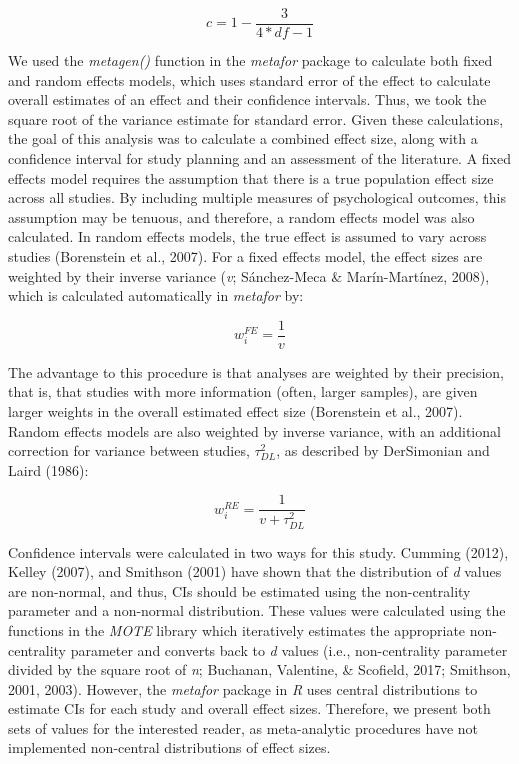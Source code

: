\documentclass[english,man, mask]{apa6}
\theoremstyle{definition}
\theoremstyle{definition}
\theoremstyle{definition}
\theoremstyle{remark}
\begin{document}
\[
c = 1 - \frac { 3 } { 4*df - 1 }
\]

We used the \emph{metagen()} function in the \emph{metafor} package to
calculate both fixed and random effects models, which uses standard
error of the effect to calculate overall estimates of an effect and
their confidence intervals. Thus, we took the square root of the
variance estimate for standard error. Given these calculations, the goal
of this analysis was to calculate a combined effect size, along with a
confidence interval for study planning and an assessment of the
literature. A fixed effects model requires the assumption that there is
a true population effect size across all studies. By including multiple
measures of psychological outcomes, this assumption may be tenuous, and
therefore, a random effects model was also calculated. In random effects
models, the true effect is assumed to vary across studies (Borenstein et
al., 2007). For a fixed effects model, the effect sizes are weighted by
their inverse variance (\emph{v}; Sánchez-Meca \& Marín-Martínez, 2008),
which is calculated automatically in \emph{metafor} by:

\[
w_{i}^{FE} = \frac {1} {v}
\]

The advantage to this procedure is that analyses are weighted by their
precision, that is, that studies with more information (often, larger
samples), are given larger weights in the overall estimated effect size
(Borenstein et al., 2007). Random effects models are also weighted by
inverse variance, with an additional correction for variance between
studies, \(\tau^2_{DL}\), as described by DerSimonian and Laird (1986):

\[
w_{i}^{RE} = \frac {1} {v + \tau^2_{DL}}
\]

Confidence intervals were calculated in two ways for this study. Cumming
(2012), Kelley (2007), and Smithson (2001) have shown that the
distribution of \emph{d} values are non-normal, and thus, CIs should be
estimated using the non-centrality parameter and a non-normal
distribution. These values were calculated using the functions in the
\emph{MOTE} library which iteratively estimates the appropriate
non-centrality parameter and converts back to \emph{d} values (i.e.,
non-centrality parameter divided by the square root of \emph{n};
Buchanan, Valentine, \& Scofield, 2017; Smithson, 2001, 2003). However,
the \emph{metafor} package in \emph{R} uses central distributions to
estimate CIs for each study and overall effect sizes. Therefore, we
present both sets of values for the interested reader, as meta-analytic
procedures have not implemented non-central distributions of effect
sizes.
\end{document}

